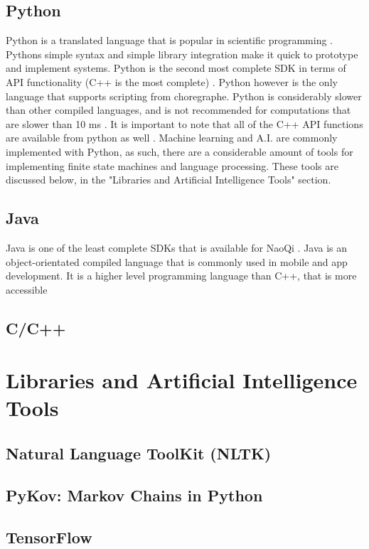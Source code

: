 \documentclass[onecolumn, draftclsnofoot,10pt, compsoc]{IEEEtran}
\begin{document}
  \subsection{Python}
  Python is a translated language that is popular in scientific programming \cite{Python.org}. Pythons simple syntax and simple library integration make it quick to prototype and implement systems. Python is the second most complete SDK in terms of API functionality (C++ is the most complete) \cite{languageBenefits}. Python however is the only language that supports scripting from choregraphe. Python is considerably slower than other compiled languages, and is not recommended for computations that are slower than 10 ms \cite{programmingLanguages}. It is important to note that all of the C++ API functions are available from python as well \cite{pythonSDK}. Machine learning and A.I. are commonly implemented with Python, as such, there are a considerable amount of tools for implementing finite state machines and language processing. These tools are discussed below, in the "Libraries and Artificial Intelligence Tools" section.
  \subsection{Java}

  Java is one of the least complete SDKs that is available for NaoQi \cite{programmingLanguages}. Java is an object-orientated compiled language that is commonly used in mobile and app development. It is a higher level programming language than C++, that is more accessible 
  \subsection{C/C++}

\section{Libraries and Artificial Intelligence Tools}
  \subsection{Natural Language ToolKit (NLTK)}
  \subsection{PyKov: Markov Chains in Python}
  \subsection{TensorFlow}
\end{document}
